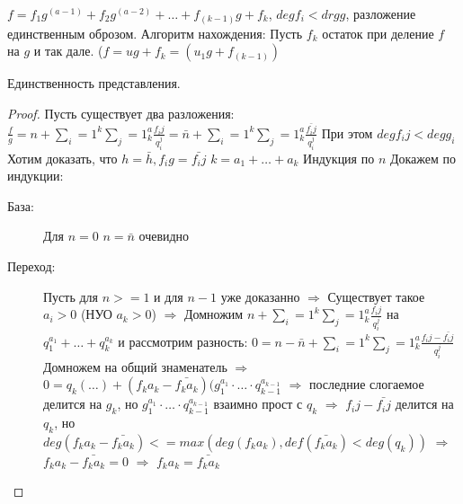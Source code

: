 \begin{Rem}
$f = f_1g^(a-1) + f_2 g^(a-2) + \dots + f_(k-1)g + f_k$,
$deg f_i < drg g$, разложение единственным оброзом.
Алгоритм нахождения:
Пусть $f_k$ остаток при деление $f$ на $g$ и так дале.
($f = ug + f_k = (u_1g + f_(k-1))$
\end{Rem}

\begin{theorem}
Единственность представления.
\begin{proof}
Пусть существует два разложения:
$\frac{f}{g} = n + \sum_i=1^k\sum_j=1^a_k \frac{f_ij}{q_i^j}
 = \bar{n} + \sum_i=1^k\sum_j=1^a_k \frac{\bar{f_ij}}{q_i^j}$ 
При этом $deg f_ij < deg g_i$
Хотим доказать, что $h = \bar{h}, f_ig = \bar{f_ij}$
$k = a_1 + \dots + a_k$
Индукция по $n$
Докажем по индукции:
\begin{description}
\item[База:] Для $n = 0$ $n = \bar{n}$
очевидно
\item[Переход:] Пусть для $n >= 1$ и для $n - 1$ уже доказанно
$\Rightarrow$ Существует такое $a_i > 0$ (НУО $a_k > 0$)
$\Rightarrow$ Домножим $n + \sum_i=1^k\sum_j=1^a_k \frac{f_ij}{q_i^j}$ на
$q_1^{a_1} + \dots + q_k^{a_k}$ и рассмотрим разность:
$0 = n - \bar{n} + \sum_i=1^k\sum_j=1^a_k \frac{f_ij - \bar{f_ij}}{q_i^j}$
Домножем на общий знаменатель $\Rightarrow$
$0 = q_k (\dots) + (f_ka_k - \bar{f_ka_k})(g_1^{a_1}\cdot\dots\cdot q_{k-1}^{a_{k-1}}$
$\Rightarrow$ последние слогаемое делится на $g_k$, но $g_1^{a_1}\cdot\dots\cdot q_{k-1}^{a_{k-1}}$
взаимно прост с $q_k$ $\Rightarrow$ $f_ij - \bar{f_ij}$ делится на $q_k$, но
$deg(f_ka_k - \bar{f_ka_k}) <= max(deg(f_ka_k), def(\bar{f_ka_k}) < deg(q_k))$
$\Rightarrow$ $f_ka_k - \bar{f_ka_k} = 0$ $\Rightarrow$ $f_ka_k = \bar{f_ka_k}$ 
\end{description}
\end{proof}
\end{theorem}
